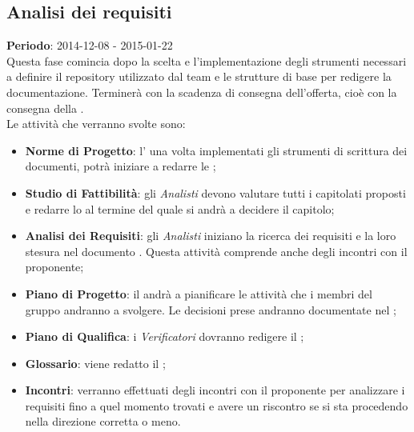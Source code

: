 	\subsection{Analisi dei requisiti} %
	\label{sub:analisi_dei_requisiti}
	\textbf{Periodo}: 2014-12-08 - 2015-01-22 \\
	Questa fase comincia dopo la scelta e l'implementazione degli strumenti necessari a definire il repository utilizzato dal team e le strutture di base per redigere la documentazione. Terminerà con la scadenza di consegna dell'offerta, cioè con la consegna della \RR. \\
	Le attività che verranno svolte sono:
		\begin{itemize}
			\item \textbf{Norme di Progetto}: l'\roleAdministrator{} una volta implementati gli strumenti di scrittura dei documenti, potrà iniziare a redarre le \docNameVersionNdP;
			\item \textbf{Studio di Fattibilità}: gli \emph{Analisti} devono valutare tutti i capitolati proposti e redarre lo \docNameVersionSdF{} al termine del quale si andrà a decidere il capitolo;
			\item \textbf{Analisi dei Requisiti}: gli \emph{Analisti} iniziano la ricerca dei requisiti e la loro stesura nel documento \docNameVersionAdR{}. Questa attività comprende anche degli incontri con il proponente;
			\item \textbf{Piano di Progetto}: il \roleProjectManager{} andrà a pianificare le attività che i membri del gruppo andranno a svolgere. Le decisioni prese andranno documentate nel \docNameVersionPdP;
			\item \textbf{Piano di Qualifica}: i \emph{Verificatori} dovranno redigere il \docNameVersionPdQ;
			\item \textbf{Glossario}: viene redatto il \docNameVersionGlo;
			\item \textbf{Incontri}: verranno effettuati degli incontri con il proponente per analizzare i requisiti fino a quel momento trovati e avere un riscontro se si sta procedendo nella direzione corretta o meno.
		\end{itemize}
	
